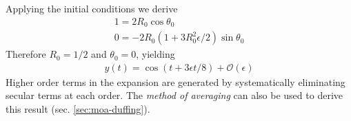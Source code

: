 Applying the initial conditions we derive
\begin{gather*}
1 = 2 R_0 \cos \theta_0 \\
0 = -2 R_0 \left(1 + 3R_0^2 \epsilon/2\right)\sin \theta_0 
\end{gather*}
Therefore $R_0 = 1/2$ and $\theta_0 = 0$, yielding
\begin{gather}\label{eqn:duffing-analytic}
y(t) = \cos \left(t + 3\epsilon t / 8\right) + \mathcal{O}(\epsilon)
\end{gather}
Higher order terms in the expansion are generated by systematically eliminating secular terms at each order. The \emph{method of averaging} can also be used to derive this result (sec. \ref{sec:moa-duffing}). 

